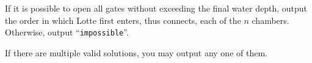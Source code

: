 
    If it is possible to open all gates without exceeding the final water depth,
    output the order in which Lotte first enters, thus connects, each of the $n$ chambers.
    Otherwise, output ``\texttt{impossible}''.

    If there are multiple valid solutions, you may output any one of them.
